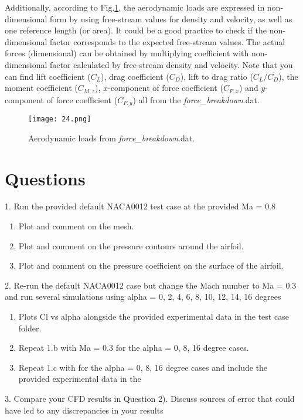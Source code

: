 Additionally, according to Fig.\ref{fig:forcefile2}, the aerodynamic loads are expressed in non-dimensional form by using free-stream values for density and velocity, as well as one reference length (or area). It could be a good practice to check if the non-dimensional factor corresponds to the expected free-stream values. The actual forces (dimensional) can be obtained by multiplying coefficient with non-dimensional factor calculated by free-stream density and velocity. Note that you can find lift coefficient ($C_L$), drag coefficient ($C_D$), lift to drag ratio ($C_L / C_D$), the moment coefficient ($C_{M,z}$), $x$-component of force coefficient ($C_{F,x}$) and $y$-component of force coefficient ($C_{F,y}$) all from the \textit{force\_breakdown}.dat.
\begin{figure}[htbp]
    \centering
    \texttt{[image: 24.png]}
    \caption{Aerodynamic loads from \textit{force\_breakdown}.dat.}
    \label{fig:forcefile2}
\end{figure}

\section{Questions}
1. Run the provided default NACA0012 test case at the provided Ma = 0.8
\begin{enumerate}[label=(\alph*)]
    \item Plot and comment on the mesh.
    \item Plot and comment on the pressure contours around the airfoil.
    \item Plot and comment on the pressure coefficient on the surface of the airfoil.
\end{enumerate}
2. Re-run the default NACA0012 case but change the Mach number to Ma = 0.3 and run several simulations using alpha = 0, 2, 4, 6, 8, 10, 12, 14, 16 degrees
\begin{enumerate}[label=(\alph*)]
    \item Plots Cl vs alpha alongside the provided experimental data \cite{ladson1988effects} in the test case folder.
    \item Repeat 1.b with Ma = 0.3 for the alpha = 0, 8, 16 degree cases.
    \item Repeat 1.c with for the alpha = 0, 8, 16 degree cases and include the provided experimental data \cite{ladson1987pressure} in the
\end{enumerate}
3. Compare your CFD results in Question 2). Discuss sources of error that could have led to any discrepancies in your results
